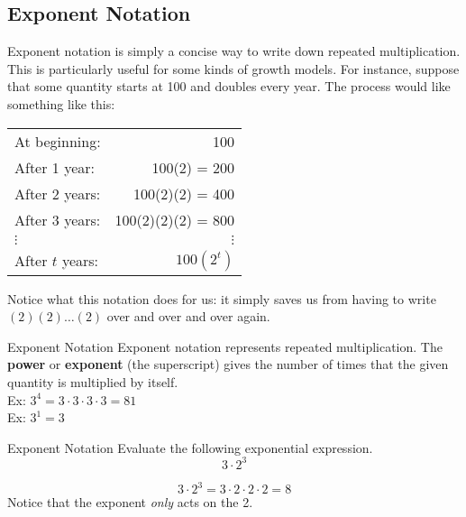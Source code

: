 \setcounter{ExampleCounter}{1}
\subsection{Exponent Notation}


Exponent notation is simply a concise way to write down repeated multiplication.  This is particularly useful for some kinds of growth models.  For instance, suppose that some quantity starts at 100 and doubles every year.  The process would like something like this:
\begin{center}
\begin{tabular}{l r}
At beginning: & 100\\
After 1 year: & 100(2) = 200\\
After 2 years: & 100(2)(2) = 400\\
After 3 years: & 100(2)(2)(2) = 800\\
$\vdots$ & $\vdots$\\
After $t$ years: & $100 \left(2^t\right)$
\end{tabular}
\end{center}

Notice what this notation does for us: it simply saves us from having to write $(2)(2)\ldots (2)$ over and over and over again.

\begin{proc}{Exponent Notation}
Exponent notation represents repeated multiplication.  The \textbf{power} or \textbf{exponent} (the superscript) gives the number of times that the given quantity is multiplied by itself.\\

Ex: $3^4 = 3 \cdot 3 \cdot 3 \cdot 3 = 81$\\

Ex: $3^1 = 3$
\end{proc}

\begin{example}{Exponent Notation}
Evaluate the following exponential expression.
\[3 \cdot 2^3\]

\sol
\[3 \cdot 2^3 = 3 \cdot 2 \cdot 2 \cdot 2 = \boxed{8}\]
Notice that the exponent \emph{only} acts on the 2.
\end{example}

